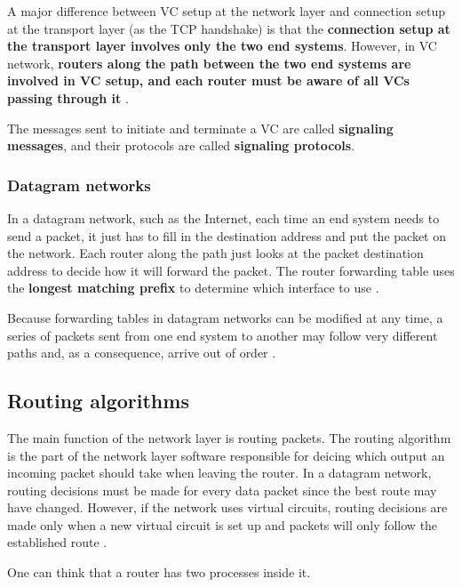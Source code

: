 \documentclass[12pt, oneside]{book}
\begin{document}
A major difference between VC setup at the network layer and connection setup at the transport layer (as the TCP handshake) is that the \textbf{connection setup at the transport layer involves only the two end systems}. However, in VC network, \textbf{routers along the path between the two end systems are involved in VC setup, and each router must be aware of all VCs passing through it} \cite[p.~316]{computer-networking-kurose-2012}.

The messages sent to initiate and terminate a VC are called \textbf{signaling messages}, and their protocols are called \textbf{signaling protocols}.

\subsubsection{Datagram networks}

In a datagram network, such as the Internet, each time an end system needs to send a packet, it just has to fill in the destination address and put the packet on the network.
Each router along the path just looks at the packet destination address to decide how it will forward the packet.
The router forwarding table uses the \textbf{longest matching prefix} to determine which interface to use \cite[p.~318]{computer-networking-kurose-2012}.

Because forwarding tables in datagram networks can be modified at any time, a series of packets sent from one end system to another may follow very different paths and, as a consequence, arrive out of order \cite[p.~319]{computer-networking-kurose-2012}.

\subsection{Routing algorithms}

The main function of the network layer is routing packets.
The routing algorithm is the part of the network layer software responsible for deicing which output an incoming packet should take when leaving the router.
In a datagram network, routing decisions must be made for every data packet since the best route may have changed.
However, if the network uses virtual circuits, routing decisions are made only when a new virtual circuit is set up and packets will only follow the established route \cite[p.~362]{computer-networks-tanenbaum-2012}.

One can think that a router has two processes inside it.
\end{document}
